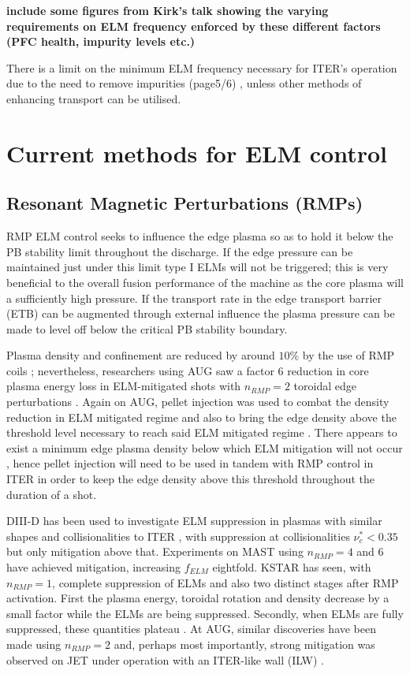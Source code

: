 \documentclass[11pt, twocolumn]{article}  %
\begin{document}
\textbf{include some figures from Kirk's talk showing the varying requirements on ELM frequency enforced by these different factors (PFC health, impurity levels etc.)}

There is a limit on the minimum ELM frequency necessary for ITER's operation due to the need to remove impurities (page5/6) \cite{Loarte2014a}, unless other methods of enhancing transport can be utilised. 

\section{Current methods for ELM control}\label{sec:Control}

\subsection{Resonant Magnetic Perturbations (RMPs)}\label{ssec:RMP}
RMP ELM control seeks to influence the edge plasma so as to hold it below the PB stability limit throughout the discharge. If the edge pressure can be maintained just under this limit type I ELMs will not be triggered; this is very beneficial to the overall fusion performance of the machine as the core plasma will a sufficiently high pressure. If the transport rate in the edge transport barrier (ETB) can be augmented through external influence the plasma pressure can be made to level off below the critical PB stability boundary. 

Plasma density and confinement are reduced by around $10\%$ by the use of RMP coils \cite{Lang2013}; nevertheless, researchers using AUG saw a factor 6 reduction in core plasma energy loss in ELM-mitigated shots with $n_{RMP}=2$ toroidal edge perturbations \cite{Suttrop2011}. Again on AUG, pellet injection was used to combat the density reduction in ELM mitigated regime and also to bring the edge density above the threshold level necessary to reach said ELM mitigated regime \cite{Lang2012}. There appears to exist a minimum edge plasma density below which ELM mitigation will not occur \cite{Suttrop2011}, hence pellet injection will need to be used in tandem with RMP control in ITER in order to keep the edge density above this threshold throughout the duration of a shot.

DIII-D has been used to investigate ELM suppression in plasmas with similar shapes and collisionalities to ITER \cite{Evans2008,Lanctot2013,Mordijck2011}, with suppression at collisionalities $\nu_c^* < 0.35$ but only mitigation above that. Experiments on MAST \cite{Kirk2013a} using $n_{RMP}=4 $ and $6$ have achieved mitigation, increasing $f_{ELM}$ eightfold. KSTAR has seen, with $n_{RMP}=1$, complete suppression of ELMs and also two distinct stages after RMP activation. First the plasma energy, toroidal rotation and density decrease by a small factor while the ELMs are being suppressed. Secondly, when ELMs are fully suppressed, these quantities plateau \cite{Kwak2013}. At AUG, similar discoveries have been made using $n_{RMP}=2$ \cite{Fischer2012,Suttrop2011} and, perhaps most importantly, strong mitigation was observed on JET under operation with an ITER-like wall (ILW) \cite{Liang2013}. 
\end{document}
